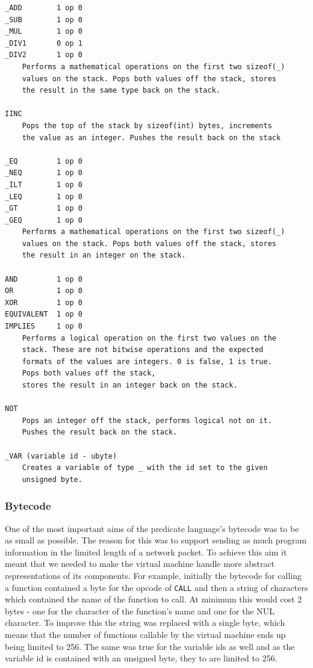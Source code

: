 \begin{verbatim}
_ADD        1 op 0
_SUB        1 op 0
_MUL        1 op 0
_DIV1       0 op 1
_DIV2       1 op 0
    Performs a mathematical operations on the first two sizeof(_)
    values on the stack. Pops both values off the stack, stores
    the result in the same type back on the stack.

IINC
    Pops the top of the stack by sizeof(int) bytes, increments
    the value as an integer. Pushes the result back on the stack

_EQ	        1 op 0
_NEQ        1 op 0
_ILT        1 op 0
_LEQ        1 op 0
_GT	        1 op 0
_GEQ        1 op 0
    Performs a mathematical operations on the first two sizeof(_)
    values on the stack. Pops both values off the stack, stores
    the result in an integer on the stack.

AND         1 op 0
OR          1 op 0
XOR	        1 op 0
EQUIVALENT  1 op 0
IMPLIES     1 op 0
    Performs a logical operation on the first two values on the
    stack. These are not bitwise operations and the expected
    formats of the values are integers. 0 is false, 1 is true.
    Pops both values off the stack,
    stores the result in an integer back on the stack.

NOT
    Pops an integer off the stack, performs logical not on it.
    Pushes the result back on the stack.
	
_VAR (variable id - ubyte)
    Creates a variable of type _ with the id set to the given
    unsigned byte.
\end{verbatim}


\subsubsection{Bytecode}

One of the most important aims of the predicate language's bytecode was to be as small as possible. The reason for this was to support sending as much program information in the limited length of a network packet. To achieve this aim it meant that we needed to make the virtual machine handle more abstract representations of its components. For example, initially the bytecode for calling a function contained a byte for the opcode of \verb|CALL| and then a string of characters which contained the name of the function to call. At minimum this would cost 2 bytes - one for the character of the function's name and one for the NUL character. To improve this the string was replaced with a single byte, which means that the number of functions callable by the virtual machine ends up being limited to 256. The same was true for the variable ids as well and as the variable id is contained with an unsigned byte, they to are limited to 256.


